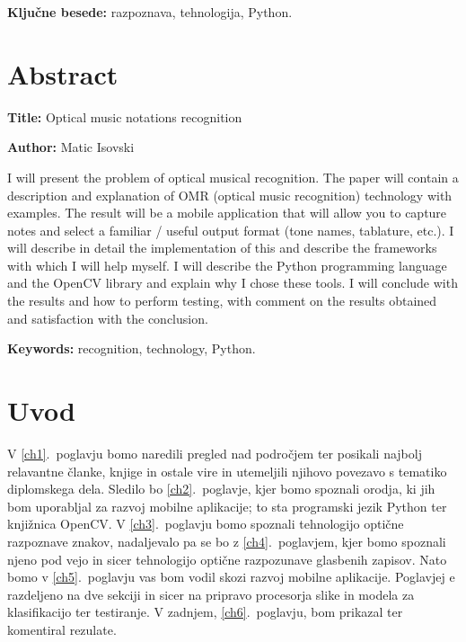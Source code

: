 \documentclass[a4paper, 12pt]{book}
\newcommand{\ttitleEn}{Optical music notations recognition}
\newcommand{\tauthor}{Matic Isovski}
\newcommand{\tkeywords}{razpoznava, tehnologija, Python}
\newcommand{\tkeywordsEn}{recognition, technology, Python}
\newcommand{\clearemptydoublepage}{\newpage{\pagestyle{empty}\cleardoublepage}}
\begin{document}
\bigskip

\noindent\textbf{Ključne besede:} \tkeywords.
\clearemptydoublepage

\chapter*{Abstract}

\noindent\textbf{Title:} \ttitleEn
\bigskip

\noindent\textbf{Author:} \tauthor
\bigskip

\noindent I will present the problem of optical musical recognition. The paper will contain a description and explanation of OMR (optical music recognition) technology with examples. The result will be a mobile application that will allow you to capture notes and select a familiar / useful output format (tone names, tablature, etc.). I will describe in detail the implementation of this and describe the frameworks with which I will help myself. I will describe the Python programming language and the OpenCV library and explain why I chose these tools. I will conclude with the results and how to perform testing, with comment on the results obtained and satisfaction with the conclusion.
\bigskip

\noindent\textbf{Keywords:} \tkeywordsEn.
\clearemptydoublepage

\mainmatter
\setcounter{page}{1}
\pagestyle{fancy}

\chapter{Uvod}
V \ref{ch1}.~poglavju bomo naredili pregled nad področjem ter posikali najbolj relavantne članke, knjige in ostale vire in utemeljili njihovo povezavo s tematiko diplomskega dela.
Sledilo bo \ref{ch2}.~poglavje, kjer bomo spoznali orodja, ki jih bom uporabljal za razvoj mobilne aplikacije; to sta programski jezik Python ter knjižnica OpenCV.
V \ref{ch3}.~poglavju bomo spoznali tehnologijo optične razpoznave znakov, nadaljevalo pa se bo z \ref{ch4}.~poglavjem, kjer bomo spoznali njeno pod vejo in sicer tehnologijo optične razpozunave glasbenih zapisov.
Nato bomo v \ref{ch5}.~poglavju vas bom vodil skozi razvoj mobilne aplikacije. Poglavjej e razdeljeno na dve sekciji in sicer na pripravo procesorja slike in modela za klasifikacijo ter testiranje.
V zadnjem, \ref{ch6}.~poglavju, bom prikazal ter komentiral rezulate.
\end{document}
